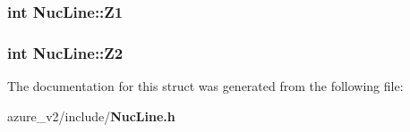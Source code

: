 \subsubsection{\setlength{\rightskip}{0pt plus 5cm}int \bf{Nuc\-Line::Z1}}\label{structNucLine_644e3fe6fc10581c2b728cbe0dedfb52}


\subsubsection{\setlength{\rightskip}{0pt plus 5cm}int \bf{Nuc\-Line::Z2}}\label{structNucLine_684d7b172ef048429e45190b8cf9aa35}




The documentation for this struct was generated from the following file:\begin{CompactItemize}
\item 
azure\_\-v2/include/\bf{Nuc\-Line.h}\end{CompactItemize}
